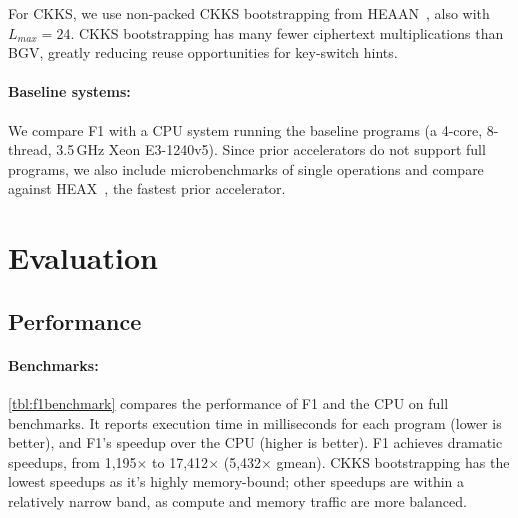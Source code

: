 
For CKKS, we use non-packed CKKS bootstrapping from HEA\-AN~\cite{cheon:eurocrypt2018:bootstrapping}, also with $L_{max} = 24$.
CKKS bootstrapping has many fewer ciphertext multiplications than BGV, greatly reducing
reuse opportunities for key-switch hints.



\paragraph{Baseline systems:}
We compare F1 with a CPU system running the baseline programs (a 4-core, 8-thread, 3.5\,GHz Xeon E3-1240v5).
Since prior accelerators do not support full programs, we also include microbenchmarks of single operations
and compare against HEAX~\cite{riazi:asplos20:heax}, the fastest prior accelerator.

\section{Evaluation}\label{sec:evaluation}
\subsection{Performance}\label{sec:perf}

\addtocounter{table}{-2}
\tblFOneBenchmark
\addtocounter{table}{1}


\paragraph{Benchmarks:}
\autoref{tbl:f1benchmark} compares the performance of F1 and the CPU on full benchmarks.
It reports execution time in milliseconds for each program (lower is better), and F1's speedup over the CPU (higher is better).
F1 achieves dramatic speedups, from 1,195$\times$ to 17,412$\times$ (5,432$\times$ gmean).
CKKS bootstrapping has the lowest speedups as it's highly memory-bound;
other speedups are within a relatively narrow band, as compute and memory traffic are more balanced.

